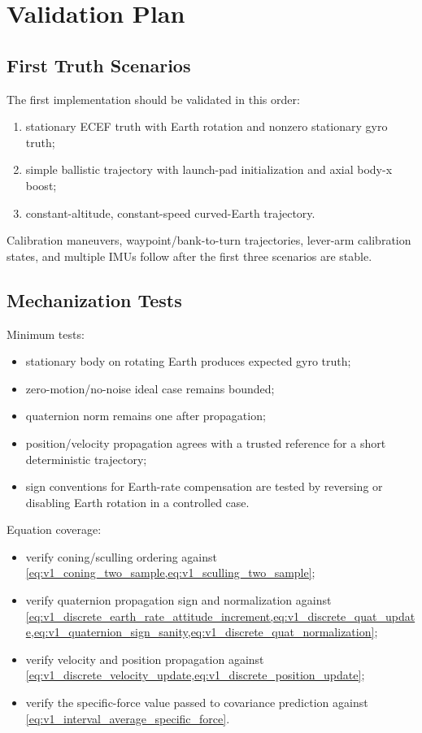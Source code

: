 \chapter{Validation Plan}

\section{First Truth Scenarios}

The first implementation should be validated in this order:
\begin{enumerate}
    \item stationary ECEF truth with Earth rotation and nonzero stationary gyro
    truth;
    \item simple ballistic trajectory with launch-pad initialization and axial
    body-x boost;
    \item constant-altitude, constant-speed curved-Earth trajectory.
\end{enumerate}

Calibration maneuvers, waypoint/bank-to-turn trajectories, lever-arm
calibration states, and multiple IMUs follow after the first three scenarios
are stable.

\section{Mechanization Tests}

Minimum tests:
\begin{itemize}
    \item stationary body on rotating Earth produces expected gyro truth;
    \item zero-motion/no-noise ideal case remains bounded;
    \item quaternion norm remains one after propagation;
    \item position/velocity propagation agrees with a trusted reference for a
    short deterministic trajectory;
    \item sign conventions for Earth-rate compensation are tested by reversing
    or disabling Earth rotation in a controlled case.
\end{itemize}

Equation coverage:
\begin{itemize}
    \item verify coning/sculling ordering against
    \cref{eq:v1_coning_two_sample,eq:v1_sculling_two_sample};
    \item verify quaternion propagation sign and normalization against
    \cref{eq:v1_discrete_earth_rate_attitude_increment,eq:v1_discrete_quat_update,eq:v1_quaternion_sign_sanity,eq:v1_discrete_quat_normalization};
    \item verify velocity and position propagation against
    \cref{eq:v1_discrete_velocity_update,eq:v1_discrete_position_update};
    \item verify the specific-force value passed to covariance prediction
    against \cref{eq:v1_interval_average_specific_force}.
\end{itemize}

